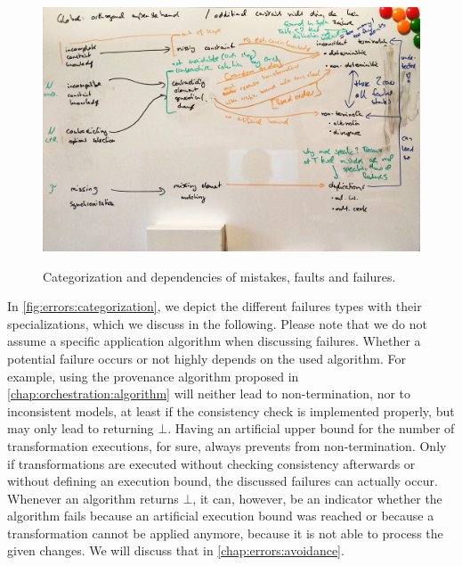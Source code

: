 \begin{figure}
    \centering
    \\
    \includegraphics[width=\textwidth]{figures/correctness/errors/categorization.jpg}
    \caption[Categorization of mistakes, faults and failures]{Categorization and dependencies of mistakes, faults and failures.}
    \label{fig:errors:categorization}
\end{figure}

In \autoref{fig:errors:categorization}, we depict the different failures types with their specializations, which we discuss in the following.
Please note that we do not assume a specific application algorithm when discussing failures.
Whether a potential failure occurs or not highly depends on the used algorithm.
For example, using the provenance algorithm proposed in \autoref{chap:orchestration:algorithm} will neither lead to non-termination, nor to inconsistent models, at least if the consistency check is implemented properly, but may only lead to returning $\bot$.
Having an artificial upper bound for the number of transformation executions, for sure, always prevents from non-termination.
Only if transformations are executed without checking consistency afterwards or without defining an execution bound, the discussed failures can actually occur.
Whenever an algorithm returns $\bot$, it can, however, be an indicator whether the algorithm fails because an artificial execution bound was reached or because a transformation cannot be applied anymore, because it is not able to process the given changes.
We will discuss that in \autoref{chap:errors:avoidance}.

